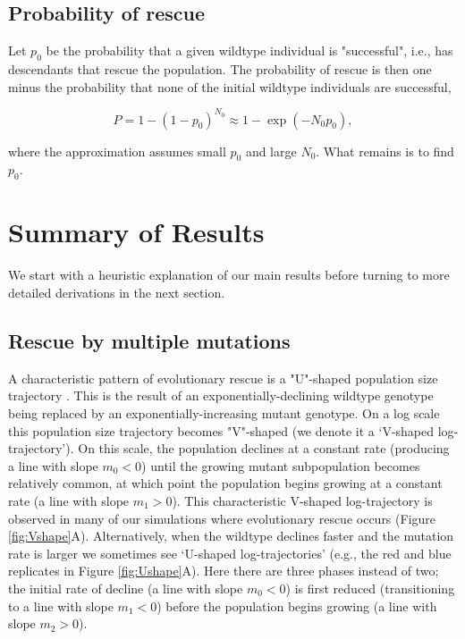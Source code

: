 \documentclass[9pt,twocolumn,twoside,lineno]{gsajnl}
\begin{document}
\subsection{Probability of rescue}

Let $p_0$ be the probability that a given wildtype individual is "successful", i.e., has descendants that rescue the population. 
The probability of rescue is then one minus the probability that none of the initial wildtype individuals are successful,

\begin{equation}\label{eq:Prescue}
P = 1-(1-p_0)^{N_0} \approx 1 - \exp \left(- N_0 p_0 \right),
\end{equation} 

\noindent where the approximation assumes small $p_0$ and large $N_0$. 
What remains is to find $p_0$.

\section{Summary of Results}
\label{sec:summary}

We start with a heuristic explanation of our main results before turning to more detailed derivations in the next section.

\subsection{Rescue by multiple mutations}

A characteristic pattern of evolutionary rescue is a "U"-shaped population size trajectory \citep[e.g.,][]{Orr2014}.
This is the result of an exponentially-declining wildtype genotype being replaced by an exponentially-increasing mutant genotype.
On a log scale this population size trajectory becomes "V"-shaped (we denote it a `V-shaped log-trajectory').
On this scale, the population declines at a constant rate (producing a line with slope $m_0<0$) until the growing mutant subpopulation becomes relatively common, at which point the population begins growing at a constant rate (a line with slope $m_1>0$).
This characteristic V-shaped log-trajectory is observed in many of our simulations where evolutionary rescue occurs (Figure \ref{fig:Vshape}A).
Alternatively, when the wildtype declines faster and the mutation rate is larger we sometimes see `U-shaped log-trajectories' (e.g., the red and blue replicates in Figure \ref{fig:Ushape}A).
Here there are three phases instead of two; the initial rate of decline (a line with slope $m_0<0$) is first reduced (transitioning to a line with slope $m_1<0$) before the population begins growing (a line with slope $m_2>0$).  
\end{document}
